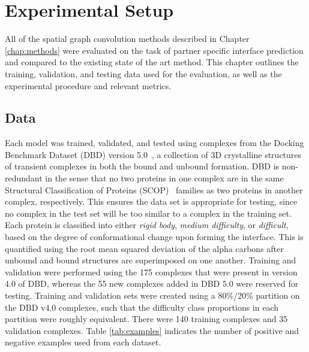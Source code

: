 \chapter{Experimental Setup}
\label{chap:experiments}

All of the spatial graph convolution methods described in Chapter \ref{chap:methods} were evaluated on the task of partner specific interface prediction and compared to the existing state of the art method.
This chapter outlines the training, validation, and testing data used for the evaluation, as well as the experimental procedure and relevant metrics.

\section{Data}

Each model was trained, validated, and tested using complexes from the Docking Benchmark Dataset (DBD) version 5.0~\cite{vreven2015}, a collection of 3D crystalline structures of transient complexes in both the bound and unbound formation. 
DBD is non-redundant in the sense that no two proteins in one complex are in the same Structural Classification of Proteins (SCOP)~\cite{murzin1995} families as two proteins in another complex, respectively.
This ensures the data set is appropriate for testing, since no complex in the test set will be too similar to a complex in the training set.
Each protein is classified into either \emph{rigid body}, \emph{medium difficulty}, or \emph{difficult}, based on the degree of conformational change upon forming the interface.
This is quantified using the root mean squared deviation of the alpha carbons after unbound and bound structures are superimposed on one another. 
Training and validation were performed using the 175 complexes that were present in version 4.0 of DBD, whereas the 55 new complexes added in DBD 5.0 were reserved for testing. 
Training and validation sets were created using a 80\%/20\% partition on the DBD v4.0 complexes, such that the difficulty class proportions in each partition were roughly equivalent.
There were 140 training complexes and 35 validation complexes.
Table \ref{tab:examples} indicates the number of positive and negative examples used from each dataset.

